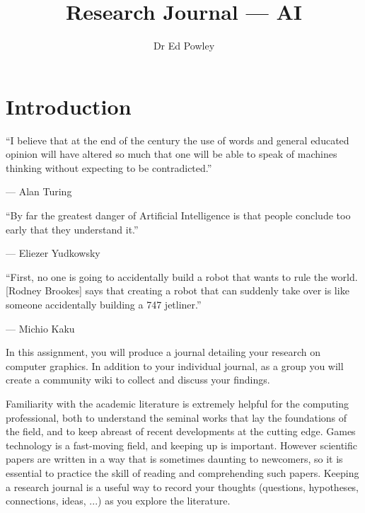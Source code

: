 \documentclass{../fal_assignment}
\title{Research Journal --- AI}
\author{Dr Ed Powley}
\begin{document}
\maketitle

\section*{Introduction}

\begin{marginquote}
  ``I believe that at the end of the century the use of words and general educated opinion will have altered so much that one will be able to speak of machines thinking without expecting to be contradicted.''
    
    --- Alan Turing
    
    \marginquoterule
    
    ``By far the greatest danger of Artificial Intelligence is that people conclude too early that they understand it.''
    
    --- Eliezer Yudkowsky
    
    \marginquoterule

        ``First, no one is going to accidentally build a robot that wants to rule the world. [Rodney Brookes] says that creating a robot that can suddenly take over is like someone accidentally building a 747 jetliner.''
    
    --- Michio Kaku
            
\end{marginquote}

In this assignment, you will produce a journal detailing your research on computer graphics. In addition to your individual journal, as a group you will create a community wiki to collect and discuss your findings.

Familiarity with the academic literature is extremely helpful for the computing professional,
both to understand the seminal works that lay the foundations of the field,
and to keep abreast of recent developments at the cutting edge.
Games technology is a fast-moving field, and keeping up is important.
However scientific papers are written in a way that is sometimes daunting to newcomers,
so it is essential to practice the skill of reading and comprehending such papers.
Keeping a research journal is a useful way to record your thoughts
(questions, hypotheses, connections, ideas, ...) as you explore the literature.
\end{document}
